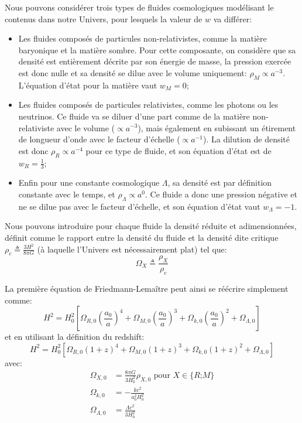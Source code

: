 \documentclass[../main/main.tex]{subfiles}
\begin{document}
Nous pouvons considérer trois types de fluides cosmologiques modélisant
le contenus dans notre
Univers, pour lesquels la valeur de $w$ va différer:
\begin{itemize}
\item Les fluides composés de particules non-relativistes, comme la
  matière baryonique et la matière sombre. Pour cette composante, on
  considère que sa densité est entièrement décrite par son énergie de
  masse, la pression exercée est donc
  nulle et sa densité se dilue avec le volume uniquement: $\rho_{M}\propto a^{-3}$. L'équation d'état pour la matière vaut $w_{M}=0$;
\item Les fluides composés de particules relativistes, comme les
  photons ou les neutrinos. Ce fluide va se diluer d'une part comme
  de la matière non-relativiste avec le volume ($\propto a^{-3}$), mais également en
  subissant un étirement de longueur d'onde avec le facteur d'échelle
  ($\propto a^{-1}$). La dilution de densité est donc
  $\rho_{R}\propto a^{-4}$ pour ce type de fluide, et son équation d'état est de
  $w_{R}=\frac{1}{3}$;
\item Enfin pour une constante cosmologique $\Lambda$, sa densité est
  par définition constante avec le temps, et $\rho_{\Lambda}\propto
  a^{0}$. Ce fluide a donc une pression négative et ne se dilue pas
  avec le facteur d'échelle, et son équation d'état vaut $w_{\Lambda}=-1$.
\end{itemize}

Nous pouvons introduire pour chaque fluide la densité réduite et
adimensionnées, définit comme le
rapport entre la densité du fluide et la densité dite critique
$\rho_{c}\triangleq\frac{3H^{2}}{8\pi G}$ (à
laquelle l'Univers est nécessairement plat) tel que:
\begin{equation}
  \label{eq:33}
  \Omega_{X}\triangleq\frac{\rho_{X}}{\rho_{c}}
\end{equation}

La première équation de Friedmann-Lemaître peut ainsi se réécrire
simplement comme:
\begin{equation}
  \label{eq:friedmannOmega}
  H^{2}=H_{0}^{2}\left[\Omega_{R,0}\left(\frac{a_{0}}{a}\right)^{4}
    +\Omega_{M,0}\left(\frac{a_{0}}{a}\right)^{3} +\Omega_{k,0}\left(\frac{a_{0}}{a}\right)^{2}+\Omega_{\Lambda,0} \right]
\end{equation}
et en utilisant la définition du redshift:
\begin{equation}
  \label{eq:friedmannZ}
  H^{2}=H_{0}^{2}\left[\Omega_{R,0}(1+z)^{4}
    +\Omega_{M,0}(1+z)^{3} +\Omega_{k,0}(1+z)^{2}+\Omega_{\Lambda,0} \right]
\end{equation}
avec:
\begin{align*}
  \Omega_{X,0}&=\frac{8\pi G}{3H_{0}^{2}}\rho_{X,0} \text{ pour
  $X\in$\{$R$;$M$\}}\\
  \Omega_{k,0}&=-\frac{kc^{2}}{a_{0}^{2}H_{0}^{2}}\\
  \Omega_{\Lambda,0}&=\frac{\Lambda c^{2}}{3H_{0}^{2}}
\end{align*}
\end{document}
